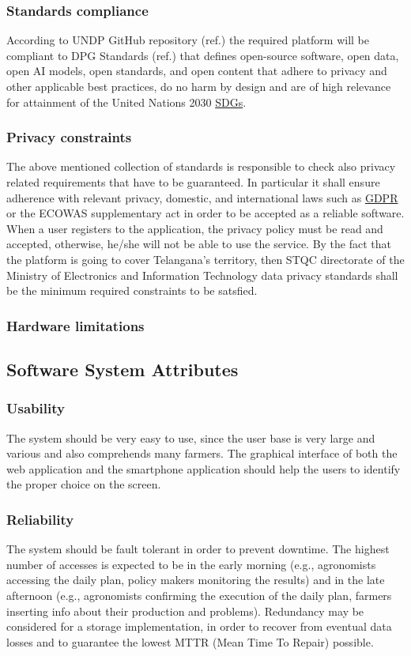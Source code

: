\subsubsection{Standards compliance}
According to UNDP GitHub repository (ref.\cite{UNDP_GitHub}) the required platform will be compliant to DPG Standards (ref.\cite{DPGS}) that defines open-source software, open data, open AI models, open standards, and open content that adhere to privacy and other applicable best practices, do no harm by design and are of high relevance for attainment of the United Nations 2030 \href{cell:sdg}{SDGs}.

\subsubsection{Privacy constraints}
The above mentioned collection of standards \cite{DPGS} is responsible to check also privacy related requirements that have to be guaranteed. In particular it shall ensure adherence with relevant privacy, domestic, and international laws such as \href{tab:acronyms_table}{GDPR} or the ECOWAS supplementary act  in order to be accepted as a reliable software. When a user registers to the application, the privacy policy must be read and accepted, otherwise, he/she will not be able to use the service. By the fact that the platform is going to cover Telangana's territory, then STQC directorate of the Ministry of Electronics and Information Technology \cite{DPGS} data privacy standards shall be the minimum required constraints to be satsfied.


\subsubsection{Hardware limitations}

\subsection{Software System Attributes}
\subsubsection{Usability}
The system should be very easy to use, since the user base is very large and various and also comprehends many farmers. The graphical interface of both the web application and the smartphone application should help the users to identify the proper choice on the screen.
\subsubsection{Reliability}
The system should be fault tolerant in order to prevent downtime. The highest number of accesses is expected to be in the early morning (e.g., agronomists accessing the daily plan, policy makers monitoring the results) and in the late afternoon (e.g., agronomists confirming the execution of the daily plan, farmers inserting info about their production and problems).
\newline
Redundancy may be considered for a storage implementation, in order to recover from eventual data losses and to guarantee the lowest MTTR (Mean Time To Repair) possible.
